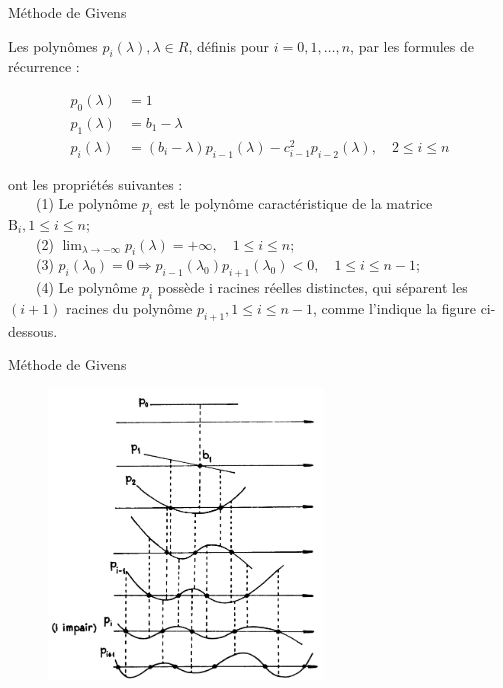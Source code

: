 \documentclass[french, 10pt]{beamer}
\theoremstyle{definition}
\begin{document}
\begin{frame}{Méthode de Givens}
	\begin{theorem}
		Les polynômes $p_i(\lambda), \lambda \in R$, définis pour $i=0,1, \ldots, n$, par les formules de récurrence :
		
		$$
		\begin{aligned}
			p_0(\lambda) & =1 \\
			p_1(\lambda) & =b_1-\lambda \\
			p_i(\lambda) & =\left(b_i-\lambda\right) p_{i-1}(\lambda)-c_{i-1}^2 p_{i-2}(\lambda), \quad 2 \leqslant i \leqslant n
		\end{aligned}
		$$
		
		ont les propriétés suivantes :
		\\\ \ \ \ (1) Le polynôme $p_i$ est le polynôme caractéristique de la matrice $\mathrm{B}_i, 1 \leqslant i \leqslant n$;
		\\\ \ \ \ (2) $\lim _{\lambda \rightarrow-\infty} p_i(\lambda)=+\infty, \quad 1 \leqslant i \leqslant n $;
		\\\ \ \ \ (3) $p_i\left(\lambda_0\right)=0 \Rightarrow p_{i-1}\left(\lambda_0\right) p_{i+1}\left(\lambda_0\right)<0, \quad 1 \leqslant i \leqslant n-1$;
		\\\ \ \ \ (4) Le polynôme $p_i$ possède i racines réelles distinctes, qui séparent les $(i+1)$ racines du polynôme $p_{i+1}, 1 \leqslant i \leqslant n-1$, comme l'indique la figure ci-dessous.
	\end{theorem}
\end{frame}
\begin{frame}{Méthode de Givens}
	\begin{figure}[h]
		\centering
		\includegraphics[width=0.65\textwidth]{pictures/four.png}  %
		\label{fig:image1}
	\end{figure}
\end{frame}
\end{document}
